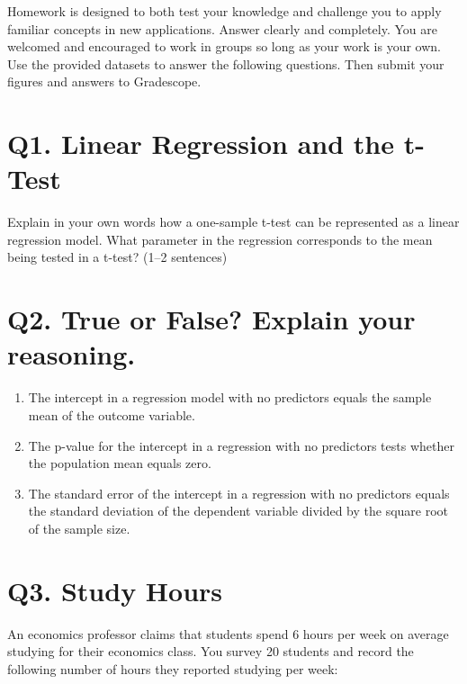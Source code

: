 \documentclass[12pt]{article}
\begin{document}
Homework is designed to both test your knowledge and challenge you to apply familiar concepts in new applications. Answer clearly and completely. You are welcomed and encouraged to work in groups so long as your work is your own. Use the provided datasets to answer the following questions. Then submit your figures and answers to Gradescope.

\section*{Q1. Linear Regression and the t-Test}

Explain in your own words how a one-sample t-test can be represented as a linear regression model. What parameter in the regression corresponds to the mean being tested in a t-test? (1--2 sentences)

\vspace{3cm}

\section*{Q2. True or False? Explain your reasoning.}

\begin{enumerate}[label=\alph*)]
    \item The intercept in a regression model with no predictors equals the sample mean of the outcome variable.
    
    \vspace{2cm}
    
    \item The p-value for the intercept in a regression with no predictors tests whether the population mean equals zero.
    
    \vspace{2cm}
    
    \item The standard error of the intercept in a regression with no predictors equals the standard deviation of the dependent variable divided by the square root of the sample size.
    
    \vspace{2cm}
\end{enumerate}

\section*{Q3. Study Hours}

An economics professor claims that students spend 6 hours per week on average studying for their economics class. You survey 20 students and record the following number of hours they reported studying per week:
\end{document}
